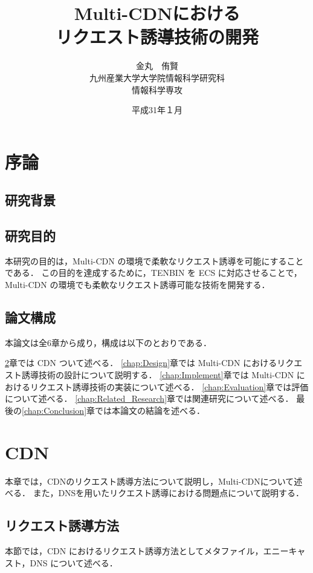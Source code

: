 \documentclass[a4j,12pt,onecolumn,oneside,titlepage,openany,final]{jreport}
\title{
 \Huge{Multi-CDNにおける}\\
 \Huge{リクエスト誘導技術の開発}
 \vspace{5.5cm}\\
}
\author{\LARGE{金丸　侑賢}\vspace{2cm}\\
\LARGE{九州産業大学大学院情報科学研究科}\vspace{0.5cm}\\
\LARGE{情報科学専攻}\vspace{1cm}\\
}
\date{\LARGE{平成31年１月}}
\begin{document}
\maketitle
\tableofcontents
\listoffigures
\listoftables

\chapter{序論}\label{chap:Prologue}

\section{研究背景}
 
\section{研究目的}
本研究の目的は，Multi-CDN の環境で柔軟なリクエスト誘導を可能にすることである．
この目的を達成するために，TENBIN を ECS に対応させることで，Multi-CDN の環境でも柔軟なリクエスト誘導可能な技術を開発する．

\section{論文構成}
 本論文は全6章から成り，構成は以下のとおりである．
   
 \ref{chap:CDN}章では CDN ついて述べる．
 \ref{chap:Design}章では Multi-CDN におけるリクエスト誘導技術の設計について説明する．
 \ref{chap:Implement}章では Multi-CDN におけるリクエスト誘導技術の実装について述べる．
 \ref{chap:Evaluation}章では評価について述べる．
 \ref{chap:Related_Research}章では関連研究について述べる．
 最後の\ref{chap:Conclusion}章では本論文の結論を述べる．


\chapter{CDN}\label{chap:CDN}
本章では，CDNのリクエスト誘導方法について説明し，Multi-CDNについて述べる．
また，DNSを用いたリクエスト誘導における問題点について説明する．

\section{リクエスト誘導方法}
本節では，CDN におけるリクエスト誘導方法としてメタファイル，エニーキャスト，DNS について述べる．
\end{document}
